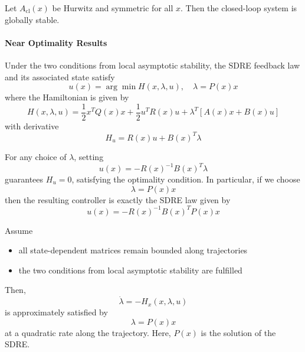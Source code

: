 \newpar{}

Let $A_{\text{cl}}(x)$ be Hurwitz and symmetric for all $x$. Then the closed-loop system is globally stable.

\paragraph{Near Optimality Results}

Under the two conditions from local asymptotic stability, the SDRE feedback law and its associated state satisfy
\begin{equation*}
    u(x) = \arg\min H(x, \lambda, u), \quad \lambda = P(x) x
\end{equation*}
where the Hamiltonian is given by
\begin{equation*}
    H(x, \lambda, u) = \frac{1}{2} x^T Q(x) x + \frac{1}{2} u^T R(x) u + \lambda^T [A(x)x + B(x)u]
\end{equation*}
with derivative
\begin{equation*}
    H_u = R(x) u + {B(x)}^T \lambda
\end{equation*}

\begin{examplesection}[Proof]
    For any choice of $\lambda$, setting
    \begin{equation*}
        u(x) = -R(x)^{-1} B(x)^T \lambda
    \end{equation*}
    guarantees $H_u = 0$, satisfying the optimality condition.
    \newpar{}
    In particular, if we choose
    \begin{equation*}
        \lambda = P(x) x
    \end{equation*}
    then the resulting controller is exactly the SDRE law given by
    \begin{equation*}
        u(x) = -{R(x)}^{-1} {B(x)}^T P(x) x
    \end{equation*}
\end{examplesection}

\newpar{}

Assume
\begin{itemize}
    \item all state-dependent matrices remain bounded along trajectories
    \item the two conditions from local asymptotic stability are fulfilled
\end{itemize}
\newpar{}
Then,
\begin{equation*}
    \dot{\lambda} = -H_x(x, \lambda, u)
\end{equation*}
is approximately satisfied by
\begin{equation*}
    \lambda = P(x) x
\end{equation*}
at a quadratic rate along the trajectory. Here, $P(x)$ is the solution of the SDRE.

